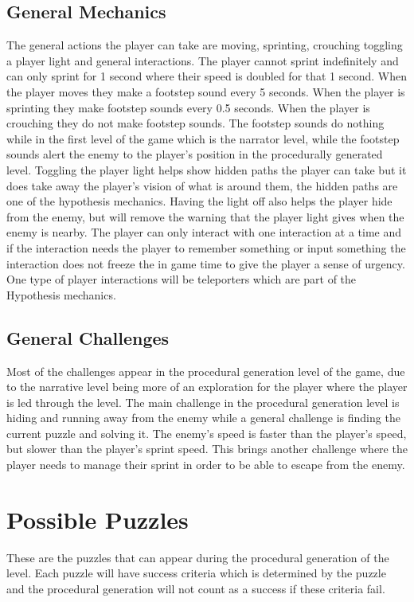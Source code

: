 \documentclass{article}
\begin{document}
\subsection{General Mechanics}
The general actions the player can take are moving, sprinting, crouching toggling a player light and general interactions.
The player cannot sprint indefinitely and can only sprint for 1 second where their speed is doubled for that 1 second.
When the player moves they make a footstep sound every 5 seconds. When the player is sprinting they make footstep sounds 
every 0.5 seconds. When the player is crouching they do not make footstep sounds. 
The footstep sounds do nothing while in the first level of the game which is the narrator level, while the footstep sounds
alert the enemy to the player's position in the procedurally generated level.
Toggling the player light helps show hidden paths the player can take but it does take away the player's vision of what
is around them, the hidden paths are one of the hypothesis mechanics. Having the light off also helps the player hide from the enemy,
but will remove the warning that the player light gives when the enemy is nearby.
The player can only interact with one interaction at a time and if the interaction needs the player to remember something
or input something the interaction does not freeze the in game time to give the player a sense of urgency. One type of player interactions
will be teleporters which are part of the Hypothesis mechanics.
\subsection{General Challenges}
Most of the challenges appear in the procedural generation level of the game, due to the narrative level being more of 
an exploration for the player where the player is led through the level.
The main challenge in the procedural generation level is hiding and running away from the enemy while a general challenge
is finding the current puzzle and solving it. The enemy's speed is
faster than the player's speed, but slower than the player's sprint speed. This brings another challenge where the player
needs to manage their sprint in order to be able to escape from the enemy.





\section{Possible Puzzles}
These are the puzzles that can appear during the procedural generation of the level. Each puzzle will 
have success criteria which is determined by the puzzle and the procedural generation will not count
as a success if these criteria fail.
\end{document}
